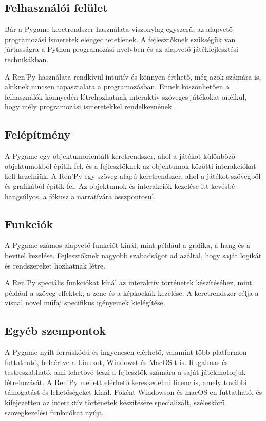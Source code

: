 \subsection{Felhasználói felület}

\indent \indent Bár a Pygame keretrendszer használata viszonylag egyszerű, az alapvető programozási ismeretek elengedhetetlenek. A fejlesztőknek szükségük van jártasságra a Python programozási nyelvben és az alapvető játékfejlesztési technikákban.

A Ren'Py használata rendkívül intuitív és könnyen érthető, még azok számára is, akiknek nincsen tapasztalata a programozásban. Ennek köszönhetően a felhasználók könnyedén létrehozhatnak interaktív szöveges játékokat anélkül, hogy mély programozási ismeretekkel rendelkeznének.
\subsection{Felépítmény}

\indent \indent A Pygame egy objektumorientált keretrendszer, ahol a játékot különböző objektumokból építik fel, és a fejlesztőknek az objektumok közötti interakciókat kell kezelniük.
A Ren'Py egy szöveg-alapú keretrendszer, ahol a játékot szövegből és grafikából építik fel. Az objektumok és interakciók kezelése itt kevésbé hangsúlyos, a fókusz a narratívára összpontosul.

\subsection{Funkciók}

\indent \indent A Pygame számos alapvető funkciót kínál, mint például a grafika, a hang és a bevitel kezelése. Fejlesztőknek nagyobb szabadságot ad azáltal, hogy saját logikát és rendszereket hozhatnak létre.

A Ren'Py speciális funkciókat kínál az interaktív történetek készítéséhez, mint például a szöveg effektek, a zene és a képkockák kezelése. A keretrendszer célja a visual novel műfaj specifikus igényeinek kielégítése.

\subsection{Egyéb szempontok}

\indent \indent A Pygame nyílt forráskódú és ingyenesen elérhető, valamint több platformon futtatható, beleértve a Linuxot, Windowst és MacOS-t is. Rugalmas és testreszabható, ami lehetővé teszi a fejlesztők számára a saját játékmotorjuk létrehozását.
A Ren'Py mellett elérhető kereskedelmi licenc is, amely további támogatást és lehetőségeket kínál. Főként Windowson és macOS-en futtatható, és kifejezetten az interaktív történetek készítésére specializált, széleskörű szövegkezelési funkciókat nyújt.

